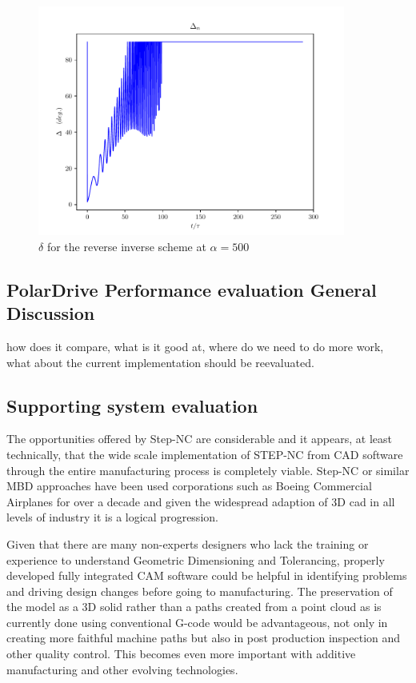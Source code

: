 \documentclass{article}
\begin{document}
\begin{figure}[h!]
  \centering
  \includegraphics[width=0.9\textwidth]{simfigs/fig5-2018-10-20T14-37-59-reverse-alpha-500.pdf}
  \captionsetup{justification=centering}
  \caption{$\delta$ for the reverse inverse scheme at $\alpha=500$}
   \label{fig:delta-rev-alpha-500}
\end{figure}

\subsection{PolarDrive Performance evaluation General Discussion}
how does it compare, what is it good at, where do we need to do more work, what about the current implementation should be reevaluated. 
   
\subsection{Supporting system evaluation}
The opportunities offered by Step-NC are considerable and it appears, at least technically, that the wide scale implementation of STEP-NC from CAD software through the entire manufacturing process is completely viable. Step-NC or similar MBD approaches have been used corporations such as Boeing Commercial Airplanes for over a decade and given the widespread adaption of 3D cad in all levels of industry it is a logical progression. \par 
Given that there are many non-experts designers who lack the training or experience to understand Geometric Dimensioning and Tolerancing, properly developed fully integrated CAM software could be helpful in identifying problems and driving design changes before going to manufacturing. The preservation of the model as a 3D solid rather than a paths created from a point cloud as is currently done using conventional G-code would be advantageous, not only in creating more faithful machine paths but also in post production inspection and other quality control. This becomes even more important with additive manufacturing and other evolving technologies. 
\end{document}
